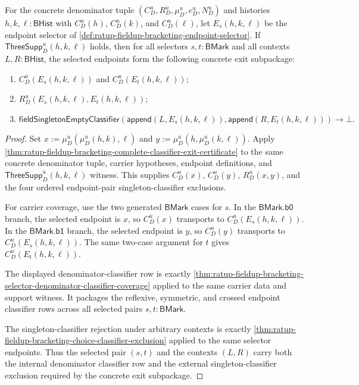 \begin{theorem}
\label{thm:ratup-fieldup-bracketing-selector-exit-subpackage}
For the concrete denominator tuple $(C_D^u,R_D^u,\mu_D^u,e_D^u,N_D^u)$ and
histories $h,k,\ell:\mathsf{BHist}$ with $C_D^u(h)$, $C_D^u(k)$, and
$C_D^u(\ell)$, let $E_s(h,k,\ell)$ be the endpoint selector of
\autoref{def:ratup-fieldup-bracketing-endpoint-selector}. If
$\mathsf{ThreeSupp}_D^u(h,k,\ell)$ holds, then for all selectors
$s,t:\mathsf{BMark}$ and all contexts $L,R:\mathsf{BHist}$, the selected
endpoints form the following concrete exit subpackage:
\begin{enumerate}
  \item $C_D^u(E_s(h,k,\ell))$ and $C_D^u(E_t(h,k,\ell))$;
  \item $R_D^u(E_s(h,k,\ell),E_t(h,k,\ell))$;
  \item
  $$
  \mathsf{fieldSingletonEmptyClassifier}
  (\mathsf{append}(L,E_s(h,k,\ell)),\mathsf{append}(R,E_t(h,k,\ell)))\to\bot.
  $$
\end{enumerate}
\end{theorem}
\begin{proof}
Set $x:=\mu_D^u(\mu_D^u(h,k),\ell)$ and
$y:=\mu_D^u(h,\mu_D^u(k,\ell))$. Apply
\autoref{thm:ratup-fieldup-bracketing-complete-classifier-exit-certificate}
to the same concrete denominator tuple, carrier hypotheses, endpoint
definitions, and $\mathsf{ThreeSupp}_D^u(h,k,\ell)$ witness. This supplies
$C_D^u(x)$, $C_D^u(y)$, $R_D^u(x,y)$, and the four ordered endpoint-pair
singleton-classifier exclusions.

For carrier coverage, use the two generated $\mathsf{BMark}$ cases for $s$.
In the $\mathsf{BMark.b0}$ branch, the selected endpoint is $x$, so
$C_D^u(x)$ transports to $C_D^u(E_s(h,k,\ell))$. In the
$\mathsf{BMark.b1}$ branch, the selected endpoint is $y$, so $C_D^u(y)$
transports to $C_D^u(E_s(h,k,\ell))$. The same two-case argument for $t$
gives $C_D^u(E_t(h,k,\ell))$.

The displayed denominator-classifier row is exactly
\autoref{thm:ratup-fieldup-bracketing-selector-denominator-classifier-coverage}
applied to the same carrier data and support witness. It packages the
reflexive, symmetric, and crossed endpoint classifier rows across all selected
pairs $s,t:\mathsf{BMark}$.

The singleton-classifier rejection under arbitrary contexts is exactly
\autoref{thm:ratup-fieldup-bracketing-choice-classifier-exclusion} applied to
the same selector endpoints. Thus the selected pair $(s,t)$ and the contexts
$(L,R)$ carry both the internal denominator classifier row and the external
singleton-classifier exclusion required by the concrete exit subpackage.
\end{proof}

